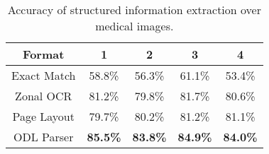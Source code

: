 \begin{table}[!hbp]
\centering
\caption{Accuracy of structured information extraction over medical images.}
\label{tab:compare}
\begin{tabular}{|c|c|c|c|c|}
\hline
Format & 1 & 2 & 3 & 4\\
\hline \hline
Exact Match & 58.8\% & 56.3\% & 61.1\% & 53.4\% \\
\hline
Zonal OCR & 81.2\% & 79.8\% & 81.7\% & 80.6\% \\
\hline
Page Layout & 79.7\% & 80.2\% & 81.2\% & 81.1\% \\
\hline
ODL Parser & {\bf 85.5\%} & {\bf 83.8\%} & {\bf 84.9\%} & {\bf 84.0\%}\\
\hline
\end{tabular}
\end{table}

